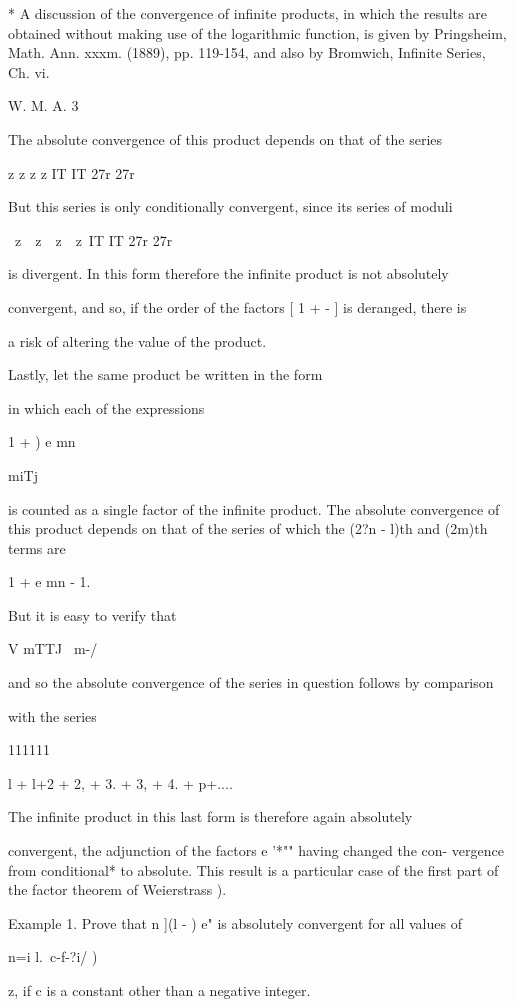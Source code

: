 * A discussion of the convergence of infinite products, in which the
results are obtained without making use of the logarithmic function,
is given by Pringsheim, Math. Ann. xxxm. (1889), pp. 119-154, and also
by Bromwich, Infinite Series, Ch. vi.

W. M. A. 3

%
%

The absolute convergence of this product depends on that of the series

z z z z IT IT 27r 27r

But this series is only conditionally convergent, since its series of
moduli

\ z\ \ z\ \ z\ \ z\ IT IT 27r 27r

is divergent. In this form therefore the infinite product is not
absolutely

convergent, and so, if the order of the factors [ 1 + - ] is deranged,
there is

a risk of altering the value of the product.

Lastly, let the same product be written in the form

in which each of the expressions

1 + ) e mn

miTj

is counted as a single factor of the infinite product. The absolute
convergence of this product depends on that of the series of which the
(2?n - l)th and (2m)th terms are

1 + e mn - 1.

But it is easy to verify that

V mTTJ \ m-/

and so the absolute convergence of the series in question follows by
comparison

with the series

111111

l + l+2 + 2, + 3. + 3, + 4. + p+....

The infinite product in this last form is therefore again absolutely

convergent, the adjunction of the factors e '*"" having changed the
con- vergence from conditional* to absolute. This result is a
particular case of the first part of the factor theorem of Weierstrass
).

Example 1. Prove that n ](l - ) e" is absolutely convergent for all
values of

n=i l.\ c-f-?i/ )

z, if c is a constant other than a negative integer.

